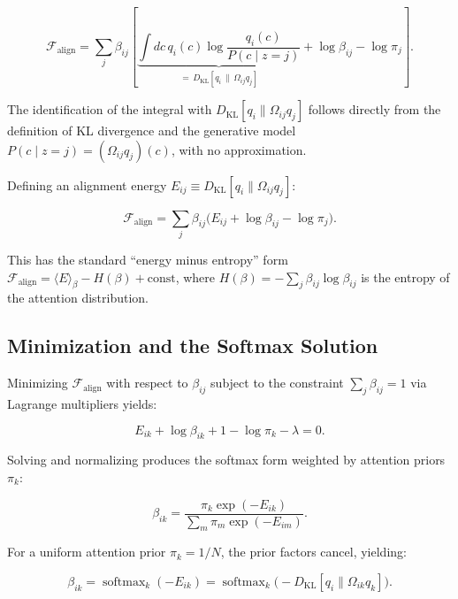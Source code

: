 \documentclass[12pt]{article}
\begin{document}
\begin{equation}
\mathcal{F}_{\text{align}} = \sum_j \beta_{ij} \left[ \underbrace{\int dc\, q_i(c) \log \frac{q_i(c)}{P(c \mid z{=}j)}}_{= \, D_{\mathrm{KL}}[q_i \,\|\, \Omega_{ij} q_j]} + \log \beta_{ij} - \log \pi_j \right].
\label{eq:mixture_free_energy}
\end{equation}

The identification of the integral with $D_{\mathrm{KL}}[q_i \| \Omega_{ij} q_j]$ follows directly from the definition of KL divergence and the generative model $P(c \mid z{=}j) = (\Omega_{ij} q_j)(c)$, with no approximation.

Defining an alignment energy $E_{ij} \equiv D_{\mathrm{KL}}[q_i \| \Omega_{ij} q_j]$:

\begin{equation}
\mathcal{F}_{\text{align}} = \sum_j \beta_{ij} \big( E_{ij} + \log \beta_{ij} - \log \pi_j \big).
\end{equation}

This has the standard ``energy minus entropy'' form $\mathcal{F}_{\text{align}} = \langle E \rangle_\beta - H(\beta) + \text{const}$, where $H(\beta) = -\sum_j \beta_{ij} \log \beta_{ij}$ is the entropy of the attention distribution.

\subsection{Minimization and the Softmax Solution}

Minimizing $\mathcal{F}_{\text{align}}$ with respect to $\beta_{ij}$ subject to the constraint $\sum_j \beta_{ij} = 1$ via Lagrange multipliers yields:

\begin{equation}
E_{ik} + \log \beta_{ik} + 1 - \log \pi_k - \lambda = 0.
\end{equation}

Solving and normalizing produces the softmax form weighted by attention priors $\pi_k$:

\begin{equation}
\beta_{ik} = \frac{\pi_k \exp(-E_{ik})}{\sum_m \pi_m \exp(-E_{im})}.
\label{eq:mixture_softmax_general}
\end{equation}

For a uniform attention prior $\pi_k = 1/N$, the prior factors cancel, yielding:

\begin{equation}
\boxed{\beta_{ik} = \operatorname{softmax}_k(-E_{ik}) = \operatorname{softmax}_k\!\big(-D_{\mathrm{KL}}[q_i \| \Omega_{ik} q_k]\big).}
\label{eq:mixture_softmax}
\end{equation}
\end{document}
